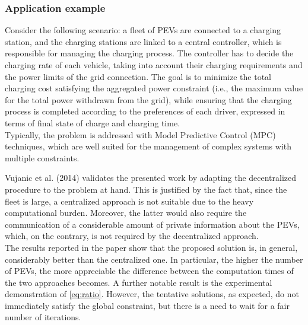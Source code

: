 \subsubsection{Application example}
Consider the following scenario: a fleet of PEVs are connected to a charging station, and the charging stations are linked to a central controller, which is responsible for managing the charging process. The controller has to decide the charging rate of each vehicle, taking into account their charging requirements and the power limits of the grid connection. The goal is to minimize the total charging cost satisfying the aggregated power constraint (i.e., the maximum value for the total power withdrawn from the grid), while ensuring that the charging process is completed according to the preferences of each driver, expressed in terms of final state of charge and charging time. \\
Typically, the problem is addressed with Model Predictive Control (MPC) techniques, which are well suited for the management of complex systems with multiple constraints.

Vujanic et al. (2014)\supercite{vujanic} validates the presented work by adapting the decentralized procedure to the problem at hand. This is justified by the fact that, since the fleet is large, a centralized approach is not suitable due to the heavy computational burden. Moreover, the latter would also require the communication of a considerable amount of private information about the PEVs, which, on the contrary, is not required by the decentralized approach.\\
The results reported in the paper show that the proposed solution is, in general, considerably better than the centralized one. In particular, the higher the number of PEVs, the more appreciable the difference between the computation times of the two approaches becomes. A further notable result is the experimental demonstration of \ref{eq:ratio}. However, the tentative solutions, as expected, do not immediately satisfy the global constraint, but there is a need to wait for a fair number of iterations.